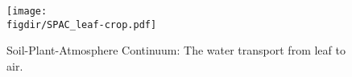 

\begin{figure}[t]
	\centering
	\texttt{[image: \\figdir/SPAC\_leaf-crop.pdf]}
	\caption{Soil-Plant-Atmosphere Continuum: The water transport from leaf to air.}
	\label{fig:SPAC_leaf}
\end{figure}

